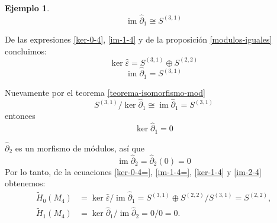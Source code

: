 \documentclass[12pt]{book}
\theoremstyle{definition}
\newtheorem{example}[theorem]{Ejemplo}
\DeclareMathOperator{\im}{im}
\newcounter{in}
\begin{document}
\begin{example}
\begin{equation}
\label{im-1-4}
\im\widehat\partial_{1}\cong S^{(3,1)}
\end{equation}

De las expresiones \ref{ker-0-4}, \ref{im-1-4} y de la
proposición \ref{modulos-iguales} concluimos:
\begin{equation}
\label{ker-0-4=}
\ker\widehat\varepsilon=S^{(3,1)}\oplus S^{(2,2)}
\end{equation}
\begin{equation}
\label{im-1-4=}
\im\widehat\partial_{1}=S^{(3,1)}
\end{equation}

Nuevamente por el teorema \ref{teorema-isomorfismo-mod}
$$S^{(3,1)}/\ker\widehat\partial_{1}\cong\im\widehat\partial_{1}= S^{(3,1)} $$
entonces
\begin{equation}
\ker\widehat\partial_{1}=0
\label{ker-1-4}
\end{equation}

$\widehat\partial_{2}$ es un morfismo de módulos, así que
\begin{equation}
\im\widehat\partial_{2}=\widehat\partial_{2}(0)=0
\label{im-2-4}
\end{equation}
Por lo tanto, de la ecuaciones \ref{ker-0-4=}, \ref{im-1-4=},
\ref{ker-1-4} y \ref{im-2-4} obtenemos:
\begin{align*}
\widetilde H_{0}(M_{4})&=\ker \widehat\varepsilon/\im
\widehat\partial_{1}=S^{(3,1)}\oplus S^{(2,2)}/S^{(3,1)}=S^{(2,2)},\\
\widetilde H_{1}(M_{4})&=\ker \widehat\partial_{1}/\im \widehat\partial_{2}=0/0=0.
\end{align*}

\end{example}
\end{document}
